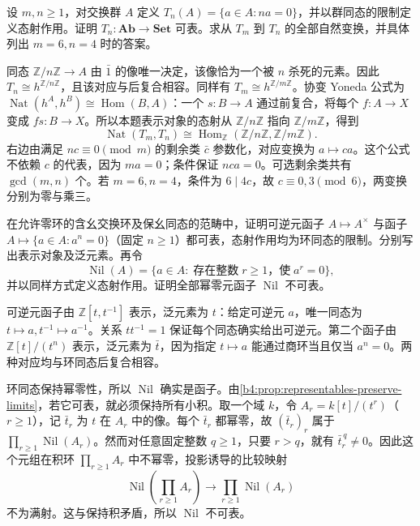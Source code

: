 \begin{exercise}\label{b4:ex:03-torsion-representations}
	设 \(m,n\ge1\)，对交换群 \(A\) 定义 \(T_n(A)=\{a\in A:na=0\}\)，并以群同态的限制定义态射作用。证明 \(T_n:\mathbf{Ab}\rightarrow\mathbf{Set}\) 可表。求从 \(T_m\) 到 \(T_n\) 的全部自然变换，并具体列出 \(m=6,n=4\) 时的答案。
\end{exercise}
\begin{solution}
	同态 \(\mathbb Z/n\mathbb Z\rightarrow A\) 由 \(\bar1\) 的像唯一决定，该像恰为一个被 \(n\) 杀死的元素。因此 \(T_n\cong h^{\mathbb Z/n\mathbb Z}\)，且该对应与后复合相容。同样有 \(T_m\cong h^{\mathbb Z/m\mathbb Z}\)。协变 Yoneda 公式为 \(\operatorname{Nat}(h^A,h^B)\cong\operatorname{Hom}(B,A)\)：一个 \(s:B\rightarrow A\) 通过前复合，将每个 \(f:A\rightarrow X\) 变成 \(fs:B\rightarrow X\)。所以本题表示对象的态射从 \(\mathbb Z/n\mathbb Z\) 指向 \(\mathbb Z/m\mathbb Z\)，得到
	\[
		\operatorname{Nat}(T_m,T_n) \cong\operatorname{Hom}_{\mathbb Z}(\mathbb Z/n\mathbb Z,\mathbb Z/m\mathbb Z).
	\]
	右边由满足 \(nc\equiv0\pmod m\) 的剩余类 \(\bar c\) 参数化，对应变换为 \(a\mapsto ca\)。这个公式不依赖 \(c\) 的代表，因为 \(ma=0\)；条件保证 \(nca=0\)。可选剩余类共有 \(\gcd(m,n)\) 个。若 \(m=6,n=4\)，条件为 \(6\mid4c\)，故 \(c\equiv0,3\pmod6\)，两变换分别为零与乘三。
\end{solution}

\begin{exercise}\label{b4:ex:03-units-nilpotents}
	在允许零环的含幺交换环及保幺同态的范畴中，证明可逆元函子 \(A\mapsto A^\times\) 与函子 \(A\mapsto\{a\in A:a^n=0\}\)（固定 \(n\ge1\)）都可表，态射作用均为环同态的限制。分别写出表示对象及泛元素。再令
	\[
		\operatorname{Nil}(A)=\{a\in A:\;\text{存在整数}\;r\ge1\text{，使}\;a^r=0\},
	\]
	并以同样方式定义态射作用。证明全部幂零元函子 \(\operatorname{Nil}\) 不可表。
\end{exercise}
\begin{solution}
	可逆元函子由 \(\mathbb Z[t,t^{-1}]\) 表示，泛元素为 \(t\)：给定可逆元 \(a\)，唯一同态为 \(t\mapsto a,t^{-1}\mapsto a^{-1}\)。关系 \(tt^{-1}=1\) 保证每个同态确实给出可逆元。第二个函子由 \(\mathbb Z[t]/(t^n)\) 表示，泛元素为 \(\bar t\)，因为指定 \(t\mapsto a\) 能通过商环当且仅当 \(a^n=0\)。两种对应均与环同态后复合相容。

	环同态保持幂零性，所以 \(\operatorname{Nil}\) 确实是函子。由\cref{b4:prop:representables-preserve-limits}，若它可表，就必须保持所有小积。取一个域 \(k\)，令 \(A_r=k[t]/(t^r)\)（\(r\ge1\)），记 \(\bar t_r\) 为 \(t\) 在 \(A_r\) 中的像。每个 \(\bar t_r\) 都幂零，故 \((\bar t_r)_r\) 属于 \(\prod_{r\ge1}\operatorname{Nil}(A_r)\)。然而对任意固定整数 \(q\ge1\)，只要 \(r>q\)，就有 \(\bar t_r^{\,q}\ne0\)。因此这个元组在积环 \(\prod_{r\ge1}A_r\) 中不幂零，投影诱导的比较映射
	\[
		\operatorname{Nil}\!\left(\prod_{r\ge1}A_r\right) \longrightarrow\prod_{r\ge1}\operatorname{Nil}(A_r)
	\]
	不为满射。这与保持积矛盾，所以 \(\operatorname{Nil}\) 不可表。
\end{solution}

